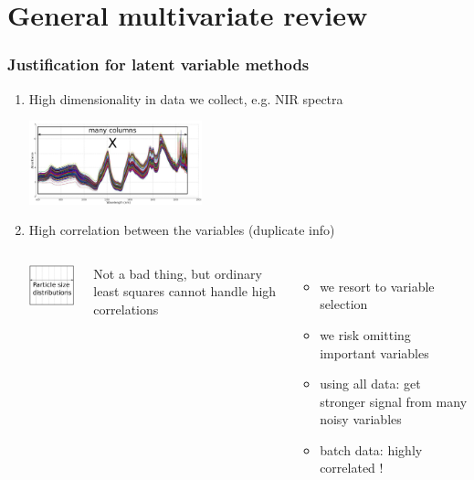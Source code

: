 \section{General multivariate review}

\begin{frame}\frametitle{Justification for latent variable methods}

\begin{enumerate}
	\item	High dimensionality in data we collect, e.g. NIR spectra
			\begin{center}
				\includegraphics[width=5cm]{images/high-dimensionality-data.jpg}
			\end{center}
			
			
	\item	High correlation between the variables (duplicate info)
			\vspace{6pt}
			\begin{columns}
				\begin{center}
					\includegraphics[width=3cm]{images/high-correlation-between-variables.png}
				\end{center}
				
				Not a bad thing, but ordinary least squares cannot handle high correlations
				\begin{itemize}
					\item	we resort to variable selection					
					\item	we risk omitting important variables
					\item	using all data: get stronger signal from many noisy variables
					\item	batch data: highly correlated !
				\end{itemize}
				
			\end{columns}
			
\end{enumerate}
\end{frame}

